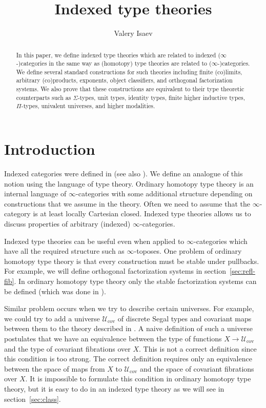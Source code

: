 \documentclass[reqno]{amsart}
\theoremstyle{definition}
\theoremstyle{remark}
\numberwithin{figure}{section}
\begin{document}
\title{Indexed type theories}

\author{Valery Isaev}

\begin{abstract}
In this paper, we define indexed type theories which are related to indexed ($\infty$-)categories in the same way as (homotopy) type theories are related to ($\infty$-)categories.
We define several standard constructions for such theories including finite (co)limits, arbitrary (co)products, exponents, object classifiers, and orthogonal factorization systems.
We also prove that these constructions are equivalent to their type theoretic counterparts such as $\Sigma$-types, unit types, identity types, finite higher inductive types, $\Pi$-types, univalent universes, and higher modalities.
\end{abstract}

\maketitle

\section{Introduction}

Indexed categories were defined in \cite{indexed-cats} (see also \cite[B1]{elephant}).
We define an analogue of this notion using the language of type theory.
Ordinary homotopy type theory is an internal language of $\infty$-categories with some additional structure depending on constructions that we assume in the theory.
Often we need to assume that the $\infty$-category is at least locally Cartesian closed.
Indexed type theories allows us to discuss properties of arbitrary (indexed) $\infty$-categories.

Indexed type theories can be useful even when applied to $\infty$-categories which have all the required structure such as $\infty$-toposes.
One problem of ordinary homotopy type theory is that every construction must be stable under pullbacks.
For example, we will define orthogonal factorization systems in section~\ref{sec:refl-fib}.
In ordinary homotopy type theory only the stable factorization systems can be defined (which was done in \cite{modality-hott}).

Similar problem occurs when we try to describe certain universes.
For example, we could try to add a universe $\mathcal{U}_\mathrm{cov}$ of discrete Segal types and covariant maps between them to the theory described in \cite{riehl-dhott}.
A naive definition of such a universe postulates that we have an equivalence between the type of functions $X \to \mathcal{U}_\mathrm{cov}$ and the type of covariant fibrations over $X$.
This is not a correct definition since this condition is too strong.
The correct definition requires only an equivalence between the space of maps from $X$ to $\mathcal{U}_\mathrm{cov}$ and the space of covariant fibrations over $X$.
It is impossible to formulate this condition in ordinary homotopy type theory, but it is easy to do in an indexed type theory as we will see in section~\ref{sec:class}.
\end{document}
